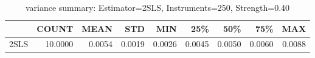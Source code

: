 \begin{table}[ht]
\centering
\caption{variance summary: Estimator=2SLS, Instruments=250, Strength=0.40}
\begin{tabular}{lrrrrrrrr}
\toprule
 & COUNT & MEAN & STD & MIN & 25\% & 50\% & 75\% & MAX \\
\midrule
2SLS & 10.0000 & 0.0054 & 0.0019 & 0.0026 & 0.0045 & 0.0050 & 0.0060 & 0.0088 \\
\bottomrule
\end{tabular}
\end{table}
